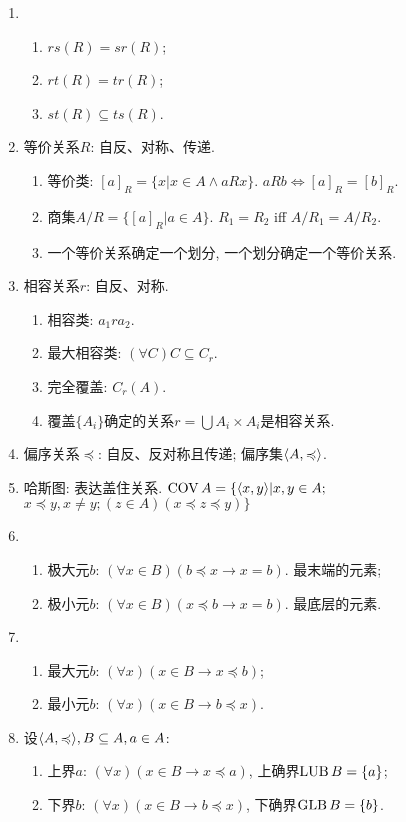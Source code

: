 \begin{enumerate}
\item
\begin{enumerate}
\item $rs(R)=sr(R)$;
\item $rt(R)=tr(R)$;
\item $st(R)\subseteq ts(R)$.
\end{enumerate}

\item 等价关系$R$: 自反、对称、传递.
\begin{enumerate}
\item 等价类: $[a]_R=\{x|x\in A\wedge aRx\}$. $aRb\Leftrightarrow [a]_R=[b]_R$.
\item 商集$A/R=\{[a]_R|a\in A\}$. $R_1=R_2$ iff $A/R_1=A/R_2$.
\item 一个等价关系确定一个划分, 一个划分确定一个等价关系.
\end{enumerate}

\item 相容关系$r$: 自反、对称.
\begin{enumerate}
\item 相容类: $a_1 r a_2$.
\item 最大相容类: $(\forall C) C\subseteq C_r$.
\item 完全覆盖: $C_r(A)$.
\item 覆盖$\{A_i\}$确定的关系$r=\bigcup A_i\times A_i$是相容关系.
\end{enumerate}

\item 偏序关系$\preccurlyeq$: 自反、反对称且传递; 偏序集$\langle A,\preccurlyeq\rangle$.
\item 哈斯图: 表达盖住关系. $\operatorname{COV} A=\{\langle x,y\rangle|x,y\in A; $\\$x\preccurlyeq y, x\neq y; (  z\in A)(x\preccurlyeq z\preccurlyeq y)\}$
\item 
\begin{enumerate}
\item 极大元$b$: $(\forall x\in B)(b\preccurlyeq x\to x=b)$. 最末端的元素;
\item 极小元$b$: $(\forall x\in B)(x\preccurlyeq b\to x=b)$. 最底层的元素.
\end{enumerate}
\item 
\begin{enumerate}
\item 最大元$b$: $(\forall x)(x\in B\to x\preccurlyeq b)$;
\item 最小元$b$: $(\forall x)(x\in B\to b\preccurlyeq x)$.
\end{enumerate}
\item 设$\langle A,\preccurlyeq\rangle, B\subseteq A, a\in A$:
\begin{enumerate}
\item 上界$a$: $(\forall x)(x\in B\to x\preccurlyeq a)$, 上确界$\operatorname{LUB} B=\{a\}$;
\item 下界$b$: $(\forall x)(x\in B\to b\preccurlyeq x)$, 下确界$\operatorname{GLB} B=\{b\}$.
\end{enumerate}


\end{enumerate}
